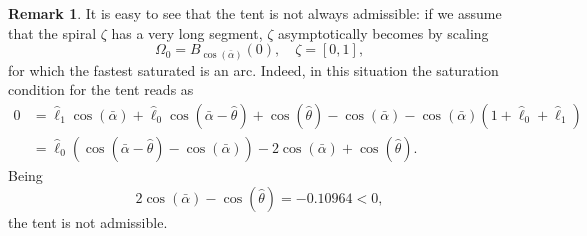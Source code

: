 \documentclass[reqno]{amsart}
\newcounter{assu}
\theoremstyle{definition} \newtheorem{definition}{Definition}[section]
\theoremstyle{definition} \newtheorem{remark}[definition]{Remark}
\theoremstyle{plain} \newtheorem{lemma}[definition]{Lemma}
\theoremstyle{plain} \newtheorem{proposition}[definition]{Proposition}
\theoremstyle{plain} \newtheorem{theorem}[definition]{Theorem}
\theoremstyle{plain} \newtheorem{corollary}[definition]{Corollary}
\theoremstyle{definition} \newtheorem{example}[definition]{Example}
\theoremstyle{plain} \newtheorem{claim}[clai]{Claim}
\theoremstyle{definition} \newtheorem{assumption}[definition]{Assumption}
\theoremstyle{definition} \newtheorem{observation}[definition]{Observation}
\newcommand{\1}{\mathbbm 1}
\numberwithin{equation}{section} %
\theoremstyle{plain} \newtheorem*{theorem*}{Theorem}
\theoremstyle{plain} \newtheorem{mthm}[maintheorem]{Main Theorem}
\theoremstyle{plain} \newtheorem*{mthm*}{Main Theorem}
\theoremstyle{plain} \newtheorem*{conjecture*}{Conjecture}
\theoremstyle{plain} \newtheorem{conjecture}[definition]{Conjecture}
\theoremstyle{plain} \newtheorem*{problem*}{Problem}
\begin{document}
%
%

\begin{remark}
\label{Rem:inital_tent}
%
It is easy to see that the tent is not always admissible: if we assume that the spiral $\zeta$ has a very long segment, $\zeta$ asymptotically becomes by scaling
\begin{equation*}
\Omega_0 = B_{\cos(\bar \alpha)}(0), \quad \zeta = [0,1],
\end{equation*}
for which the fastest saturated is an arc. Indeed, in this situation the saturation condition for the tent reads as
\begin{align*}
0 &= \hat \ell_1 \cos(\bar \alpha) + \hat \ell_0 \cos(\bar \alpha - \hat \theta) + \cos(\hat \theta) - \cos(\bar \alpha) - \cos(\bar \alpha) (1 + \hat \ell_0 + \hat \ell_1) \\
&= \hat \ell_0 (\cos(\bar \alpha - \hat \theta) - \cos(\bar \alpha)) - 2 \cos(\bar \alpha) + \cos(\hat \theta).
\end{align*}
Being
\begin{equation*}
2 \cos(\bar \alpha) - \cos(\hat \theta) = - 0.10964 < 0,
\end{equation*}
the tent is not admissible.
\end{remark}
\end{document}
